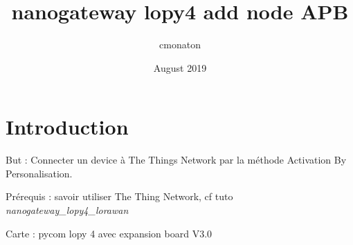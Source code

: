 \documentclass{article}
\title{nanogateway lopy4 add node APB}
\author{cmonaton }
\date{August 2019}
\begin{document}
\maketitle





\section{Introduction}
But : Connecter un device à The Things Network par la méthode Activation By Personalisation. 

Prérequis : savoir utiliser The Thing Network, cf tuto \textit{nanogateway\_lopy4\_lorawan}

Carte : pycom lopy 4 avec expansion board V3.0
\end{document}
